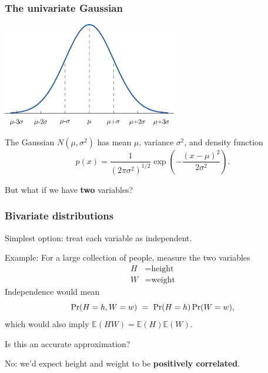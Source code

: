 \documentclass[smaller,handout]{beamer}
\def\E{{\mathbb E}}
\def\darkred{\color{red!70!black}}
\def\v2{{\vskip.2in}}
\def\E{{\mathbb E}}
\def\pr{{\mbox{\rm Pr}}}
\begin{document}
\begin{frame}
\frametitle{The univariate Gaussian}

\begin{center}
\includegraphics[width=3in]{gaussian1.jpg}
\end{center}

The Gaussian $N(\mu, \sigma^2)$ has mean $\mu$, variance $\sigma^2$, and density function
$$ p(x) = \frac{1}{(2\pi \sigma^2)^{1/2}} \exp \left( - \frac{(x-\mu)^2}{2\sigma^2} \right) .$$

\pause
\alert{But what if we have {\bf two} variables?}

\end{frame}

\begin{frame}
\frametitle{Bivariate distributions}

{\darkred Simplest option: treat each variable as independent.}

\pause\v2
Example: For a large collection of people, measure the two variables
\begin{align*}
H &= \mbox{height} \\
W &= \mbox{weight}
\end{align*}
Independence would mean
$$ \pr(H = h, W = w) \ = \ \pr(H=h) \, \pr(W=w) ,$$
which would also imply $\E(HW) = \E(H) \E(W)$.
 
\pause\v2
\alert{Is this an accurate approximation?}
\pause

\alert{No: we'd expect height and weight to be {\bf positively correlated}.}

\end{frame}
\end{document}
